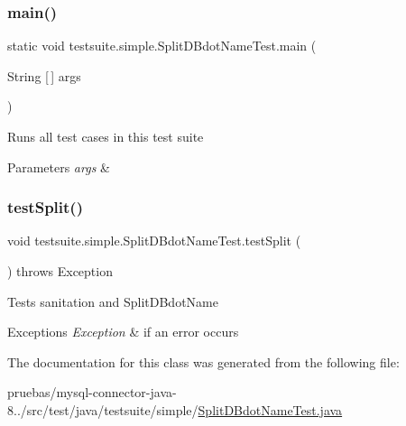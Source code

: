 \subsubsection{\texorpdfstring{main()}{main()}}
{\footnotesize\ttfamily static void testsuite.\+simple.\+Split\+D\+Bdot\+Name\+Test.\+main (\begin{DoxyParamCaption}\item[{String \mbox{[}$\,$\mbox{]}}]{args }\end{DoxyParamCaption})\hspace{0.3cm}{\ttfamily [static]}}

Runs all test cases in this test suite


\begin{DoxyParams}{Parameters}
{\em args} & \\
\hline
\end{DoxyParams}
\mbox{\label{classtestsuite_1_1simple_1_1_split_d_bdot_name_test_a079789e05d1272485f650f92c91777fa}} 
\subsubsection{\texorpdfstring{test\+Split()}{testSplit()}}
{\footnotesize\ttfamily void testsuite.\+simple.\+Split\+D\+Bdot\+Name\+Test.\+test\+Split (\begin{DoxyParamCaption}{ }\end{DoxyParamCaption}) throws Exception}

Tests sanitation and Split\+D\+Bdot\+Name


\begin{DoxyExceptions}{Exceptions}
{\em Exception} & if an error occurs \\
\hline
\end{DoxyExceptions}


The documentation for this class was generated from the following file\+:\begin{DoxyCompactItemize}
\item 
pruebas/mysql-\/connector-\/java-\/8../src/test/java/testsuite/simple/\mbox{\hyperlink{_split_d_bdot_name_test_8java}{Split\+D\+Bdot\+Name\+Test.\+java}}\end{DoxyCompactItemize}
